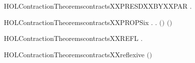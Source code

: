 \newcommand{\HOLContractionTheoremscontractsXXPRESDXXBYXXGUARDEDXXSUM}{\UseVerbatim{HOLContractionTheoremscontractsXXPRESDXXBYXXGUARDEDXXSUM}}
\begin{SaveVerbatim}{HOLContractionTheoremscontractsXXPRESDXXBYXXPAR}
\HOLTokenTurnstile{} \HOLSymConst{\HOLTokenForall{}}   .
          \HOLSymConst{\HOLTokenConj{}}    \HOLSymConst{\HOLTokenImp{}}
        \HOLSymConst{\ensuremath{\mid}}    \HOLSymConst{\ensuremath{\mid}} 
\end{SaveVerbatim}
\newcommand{\HOLContractionTheoremscontractsXXPRESDXXBYXXPAR}{\UseVerbatim{HOLContractionTheoremscontractsXXPRESDXXBYXXPAR}}
\begin{SaveVerbatim}{HOLContractionTheoremscontractsXXPROPSix}
\HOLTokenTurnstile{} \HOLSymConst{\HOLTokenForall{}} .    \HOLSymConst{\HOLTokenImp{}} \HOLSymConst{\HOLTokenForall{}}.  \ensuremath{(}\HOLSymConst{\ensuremath{\ldotp}}\ensuremath{)} \ensuremath{(}\HOLSymConst{\ensuremath{\ldotp}}\ensuremath{)}
\end{SaveVerbatim}
\newcommand{\HOLContractionTheoremscontractsXXPROPSix}{\UseVerbatim{HOLContractionTheoremscontractsXXPROPSix}}
\begin{SaveVerbatim}{HOLContractionTheoremscontractsXXREFL}
\HOLTokenTurnstile{} \HOLSymConst{\HOLTokenForall{}}.   
\end{SaveVerbatim}
\newcommand{\HOLContractionTheoremscontractsXXREFL}{\UseVerbatim{HOLContractionTheoremscontractsXXREFL}}
\begin{SaveVerbatim}{HOLContractionTheoremscontractsXXreflexive}
\HOLTokenTurnstile{}  \ensuremath{(}\ensuremath{)}
\end{SaveVerbatim}
\newcommand{\HOLContractionTheoremscontractsXXreflexive}{\UseVerbatim{HOLContractionTheoremscontractsXXreflexive}}
